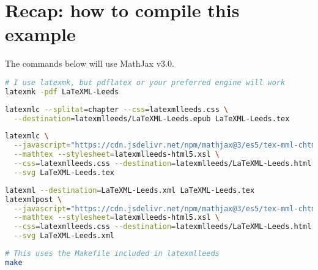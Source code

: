 \documentclass[a4paper]{article}
\theoremstyle{definition}
\begin{document}
\section{Recap: how to compile this example}
The commands below will use MathJax v3.0.
\begin{lstlisting}[language=bash,caption={Generate the PDF}]
# I use latexmk, but pdflatex or your preferred engine will work
latexmk -pdf LaTeXML-Leeds
\end{lstlisting}
\begin{lstlisting}[language=bash,caption={Generate the EPUB}]
latexmlc --splitat=chapter --css=latexmlleeds.css \
  --destination=latexmlleeds/LaTeXML-Leeds.epub LaTeXML-Leeds.tex
\end{lstlisting}
\begin{lstlisting}[language=bash,caption={Generate the HTML}]
latexmlc \
  --javascript="https://cdn.jsdelivr.net/npm/mathjax@3/es5/tex-mml-chtml.js" \
  --mathtex --stylesheet=latexmlleeds-html5.xsl \
  --css=latexmlleeds.css --destination=latexmlleeds/LaTeXML-Leeds.html \
  --svg LaTeXML-Leeds.tex
\end{lstlisting}
\begin{lstlisting}[language=bash,caption={Generate the HTML in two steps}]
latexml --destination=LaTeXML-Leeds.xml LaTeXML-Leeds.tex
latexmlpost \
  --javascript="https://cdn.jsdelivr.net/npm/mathjax@3/es5/tex-mml-chtml.js" \
  --mathtex --stylesheet=latexmlleeds-html5.xsl \
  --css=latexmlleeds.css --destination=latexmlleeds/LaTeXML-Leeds.html \
  --svg LaTeXML-Leeds.xml
\end{lstlisting}
\begin{lstlisting}[language=bash,caption={Do all the above steps in one go}]
# This uses the Makefile included in latexmlleeds
make
\end{lstlisting}
\end{document}
